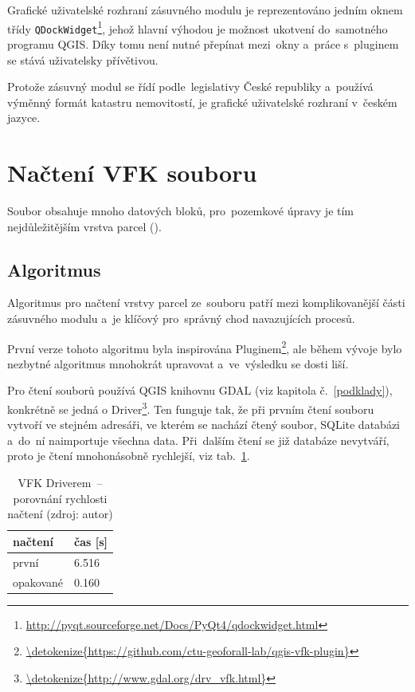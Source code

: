 Grafické uživatelské rozhraní zásuvného modulu je reprezentováno
jedním oknem třídy
\texttt{QDockWidget}\footnote{\url{http://pyqt.sourceforge.net/Docs/PyQt4/qdockwidget.html}},
jehož hlavní výhodou je možnost ukotvení do~samotného programu
QGIS. Díky tomu není nutné přepínat mezi~okny a~práce s~pluginem se
stává uživatelsky přívětivou.

Protože zásuvný modul se řídí podle~legislativy České republiky
a~používá výmě\-nný formát katastru nemovitostí, je grafické
uživatelské rozhraní v~českém jazyce.

\section{Načtení VFK souboru}
\label{nacteni_vfk}

Soubor  obsahuje mnoho datových bloků, pro~pozemkové úpravy je
tím nejdůležitějším vrstva parcel (\texttt{}).

\subsection{Algoritmus}
\label{nacteni_vfk_algoritmus}

Algoritmus pro načtení vrstvy parcel ze~souboru  patří mezi
komplikovanější části zásuvného modulu a~je klíčový pro~správný chod
navazujících procesů.

První verze tohoto algoritmu byla inspirována 
Pluginem\footnote{\url{\detokenize{https://github.com/ctu-geoforall-lab/qgis-vfk-plugin}}},
ale během vývoje bylo nezbytné algoritmus mnohokrát upravovat
a~ve~výsledku se dosti liší.

Pro čtení  souborů používá QGIS knihovnu GDAL (viz kapitola
č.~\ref{podklady}), konkrétně se jedná o 
Driver\footnote{\url{\detokenize{http://www.gdal.org/drv_vfk.html}}}. Ten
funguje tak, že při prvním čtení souboru vytvoří ve stejném adresáři,
ve kterém se nachází čtený  soubor, SQLite databázi a~do~ní
naimportuje všechna data. Při~dalším čtení se již databáze nevytváří,
proto je čtení mnohonásobně rychlejší, viz
tab.~\ref{tab:nacteni_vfk_driver}.

\begin{table}[H]
    \begin{tabular}{|l|l|} \hline načtení & čas [s] \\ \hline \hline
první & 6.516 \\ \hline opakované & 0.160 \\ \hline
    \end{tabular} \centering
    \caption[VFK Driverem~– porovnání rychlosti načtení]{VFK
Driverem~– porovnání rychlosti načtení (zdroj: autor)}
    \label{tab:nacteni_vfk_driver}
\end{table}

